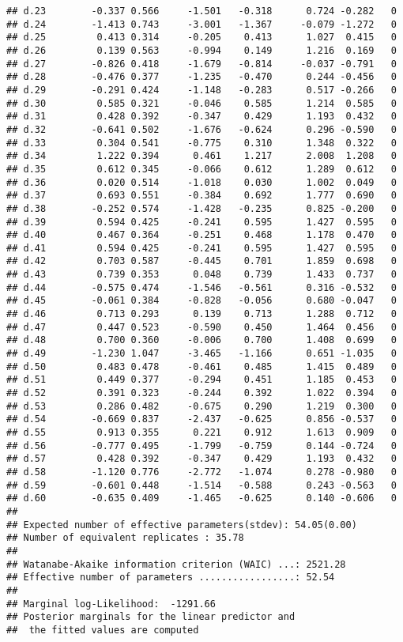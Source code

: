 \documentclass[
]{article}
\begin{document}
\begin{verbatim}
## d.23        -0.337 0.566     -1.501   -0.318      0.724 -0.282   0
## d.24        -1.413 0.743     -3.001   -1.367     -0.079 -1.272   0
## d.25         0.413 0.314     -0.205    0.413      1.027  0.415   0
## d.26         0.139 0.563     -0.994    0.149      1.216  0.169   0
## d.27        -0.826 0.418     -1.679   -0.814     -0.037 -0.791   0
## d.28        -0.476 0.377     -1.235   -0.470      0.244 -0.456   0
## d.29        -0.291 0.424     -1.148   -0.283      0.517 -0.266   0
## d.30         0.585 0.321     -0.046    0.585      1.214  0.585   0
## d.31         0.428 0.392     -0.347    0.429      1.193  0.432   0
## d.32        -0.641 0.502     -1.676   -0.624      0.296 -0.590   0
## d.33         0.304 0.541     -0.775    0.310      1.348  0.322   0
## d.34         1.222 0.394      0.461    1.217      2.008  1.208   0
## d.35         0.612 0.345     -0.066    0.612      1.289  0.612   0
## d.36         0.020 0.514     -1.018    0.030      1.002  0.049   0
## d.37         0.693 0.551     -0.384    0.692      1.777  0.690   0
## d.38        -0.252 0.574     -1.428   -0.235      0.825 -0.200   0
## d.39         0.594 0.425     -0.241    0.595      1.427  0.595   0
## d.40         0.467 0.364     -0.251    0.468      1.178  0.470   0
## d.41         0.594 0.425     -0.241    0.595      1.427  0.595   0
## d.42         0.703 0.587     -0.445    0.701      1.859  0.698   0
## d.43         0.739 0.353      0.048    0.739      1.433  0.737   0
## d.44        -0.575 0.474     -1.546   -0.561      0.316 -0.532   0
## d.45        -0.061 0.384     -0.828   -0.056      0.680 -0.047   0
## d.46         0.713 0.293      0.139    0.713      1.288  0.712   0
## d.47         0.447 0.523     -0.590    0.450      1.464  0.456   0
## d.48         0.700 0.360     -0.006    0.700      1.408  0.699   0
## d.49        -1.230 1.047     -3.465   -1.166      0.651 -1.035   0
## d.50         0.483 0.478     -0.461    0.485      1.415  0.489   0
## d.51         0.449 0.377     -0.294    0.451      1.185  0.453   0
## d.52         0.391 0.323     -0.244    0.392      1.022  0.394   0
## d.53         0.286 0.482     -0.675    0.290      1.219  0.300   0
## d.54        -0.669 0.837     -2.437   -0.625      0.856 -0.537   0
## d.55         0.913 0.355      0.221    0.912      1.613  0.909   0
## d.56        -0.777 0.495     -1.799   -0.759      0.144 -0.724   0
## d.57         0.428 0.392     -0.347    0.429      1.193  0.432   0
## d.58        -1.120 0.776     -2.772   -1.074      0.278 -0.980   0
## d.59        -0.601 0.448     -1.514   -0.588      0.243 -0.563   0
## d.60        -0.635 0.409     -1.465   -0.625      0.140 -0.606   0
## 
## Expected number of effective parameters(stdev): 54.05(0.00)
## Number of equivalent replicates : 35.78 
## 
## Watanabe-Akaike information criterion (WAIC) ...: 2521.28
## Effective number of parameters .................: 52.54
## 
## Marginal log-Likelihood:  -1291.66 
## Posterior marginals for the linear predictor and
##  the fitted values are computed
\end{verbatim}
\end{document}
